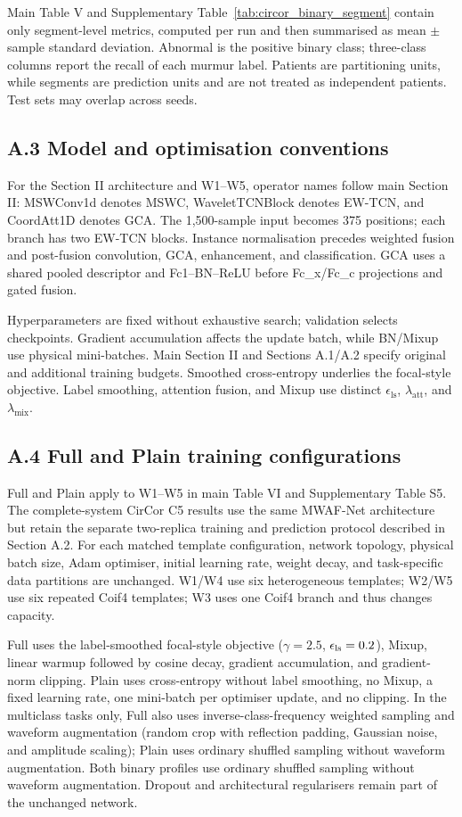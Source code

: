 Main Table V and Supplementary Table~\ref{tab:circor_binary_segment} contain only segment-level metrics, computed per run and then summarised as mean $\pm$ sample standard deviation. Abnormal is the positive binary class; three-class columns report the recall of each murmur label. Patients are partitioning units, while segments are prediction units and are not treated as independent patients. Test sets may overlap across seeds.

\subsection*{A.3 Model and optimisation conventions}
For the Section II architecture and W1--W5, operator names follow main Section II: MSWConv1d denotes MSWC, WaveletTCNBlock denotes EW-TCN, and CoordAtt1D denotes GCA. The 1,500-sample input becomes 375 positions; each branch has two EW-TCN blocks. Instance normalisation precedes weighted fusion and post-fusion convolution, GCA, enhancement, and classification. GCA uses a shared pooled descriptor and Fc1--BN--ReLU before Fc\_x/Fc\_c projections and gated fusion.

Hyperparameters are fixed without exhaustive search; validation selects checkpoints. Gradient accumulation affects the update batch, while BN/Mixup use physical mini-batches. Main Section II and Sections A.1/A.2 specify original and additional training budgets. Smoothed cross-entropy underlies the focal-style objective. Label smoothing, attention fusion, and Mixup use distinct $\epsilon_{\mathrm{ls}}$, $\lambda_{\mathrm{att}}$, and $\lambda_{\mathrm{mix}}$.

\subsection*{A.4 Full and Plain training configurations}
Full and Plain apply to W1--W5 in main Table VI and Supplementary Table S5. The complete-system CirCor C5 results use the same MWAF-Net architecture but retain the separate two-replica training and prediction protocol described in Section A.2. For each matched template configuration, network topology, physical batch size, Adam optimiser, initial learning rate, weight decay, and task-specific data partitions are unchanged. W1/W4 use six heterogeneous templates; W2/W5 use six repeated Coif4 templates; W3 uses one Coif4 branch and thus changes capacity.

Full uses the label-smoothed focal-style objective ($\gamma=2.5$, $\epsilon_{\rm ls}=0.2$), Mixup, linear warmup followed by cosine decay, gradient accumulation, and gradient-norm clipping. Plain uses cross-entropy without label smoothing, no Mixup, a fixed learning rate, one mini-batch per optimiser update, and no clipping. In the multiclass tasks only, Full also uses inverse-class-frequency weighted sampling and waveform augmentation (random crop with reflection padding, Gaussian noise, and amplitude scaling); Plain uses ordinary shuffled sampling without waveform augmentation. Both binary profiles use ordinary shuffled sampling without waveform augmentation. Dropout and architectural regularisers remain part of the unchanged network.

